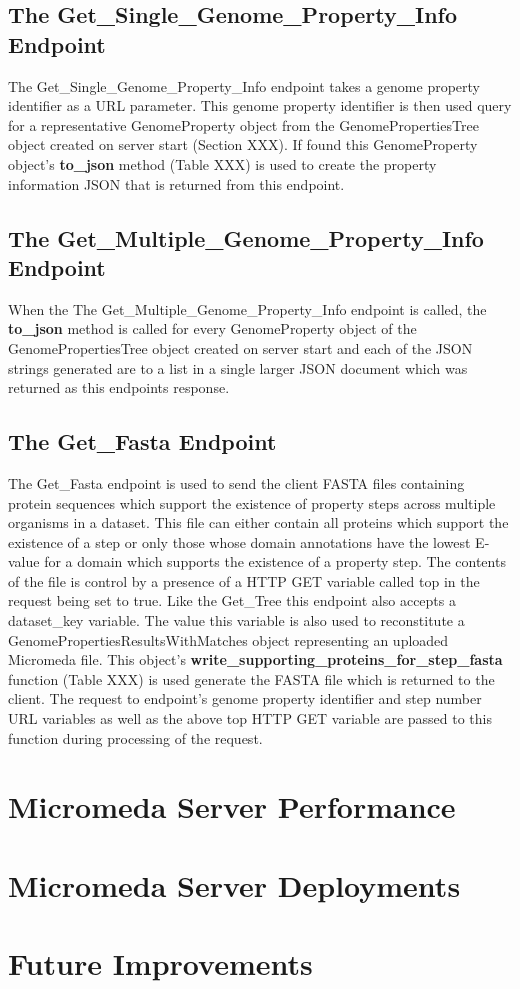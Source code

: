 \subsection{The Get\_Single\_Genome\_Property\_Info Endpoint}

The Get\_Single\_Genome\_Property\_Info endpoint takes a genome property identifier as a URL parameter. This genome property identifier is then used query for a representative GenomeProperty object from the GenomePropertiesTree object created on server start (Section XXX). If found this GenomeProperty object's \textbf{to\_json} method (Table XXX) is used to create the property information JSON that is returned from this endpoint.

\subsection{The Get\_Multiple\_Genome\_Property\_Info Endpoint}

When the The Get\_Multiple\_Genome\_Property\_Info endpoint is called, the \textbf{to\_json} method is called for every GenomeProperty object of the GenomePropertiesTree object created on server start and each of the JSON strings generated are to a list in a single larger JSON document which was returned as this endpoints response. 

\subsection{The Get\_Fasta Endpoint}

The Get\_Fasta endpoint is used to send the client FASTA files containing protein sequences which support the existence of property steps across multiple organisms in a dataset. This file can either contain all proteins which support the existence of a step or only those whose domain annotations have the lowest E-value for a domain which supports the existence of a property step. The contents of the file is control by a presence of a HTTP GET variable called top in the request being set to true. Like the  Get\_Tree this endpoint also accepts a dataset\_key variable. The value this variable is also used to reconstitute a GenomePropertiesResultsWithMatches object representing an uploaded Micromeda file. This object's \textbf{write\_supporting\_proteins\_for\_step\_fasta} function (Table XXX) is used generate the FASTA file which is returned to the client. The request to endpoint's genome property identifier and step number URL variables as well as the above top HTTP GET variable are passed to this function during processing of the request.

\section{Micromeda Server Performance}

\section{Micromeda Server Deployments}

\section{Future Improvements}
